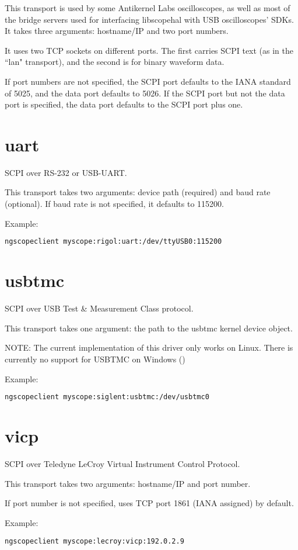 This transport is used by some Antikernel Labs oscilloscopes, as well as most of the bridge servers used for interfacing
libscopehal with USB oscilloscopes' SDKs. It takes three arguments: hostname/IP and two port numbers.

It uses two TCP sockets on different ports. The first carries SCPI text (as in the ``lan" transport), and the second is
for binary waveform data.

If port numbers are not specified, the SCPI port defaults to the IANA standard of 5025, and the data port defaults to
5026. If the SCPI port but not the data port is specified, the data port defaults to the SCPI port plus one.

\section{uart}

SCPI over RS-232 or USB-UART.

This transport takes two arguments: device path (required) and baud rate (optional). If baud rate is not specified, it
defaults to 115200.

Example:
\begin{lstlisting}[language=sh, numbers=none]
ngscopeclient myscope:rigol:uart:/dev/ttyUSB0:115200
\end{lstlisting}

\section{usbtmc}

SCPI over USB Test \& Measurement Class protocol.

This transport takes one argument: the path to the usbtmc kernel device object.

NOTE: The current implementation of this driver only works on Linux. There is currently no support for USBTMC on
Windows ()

Example:
\begin{lstlisting}[language=sh, numbers=none]
ngscopeclient myscope:siglent:usbtmc:/dev/usbtmc0
\end{lstlisting}

\section{vicp}

SCPI over Teledyne LeCroy Virtual Instrument Control Protocol.

This transport takes two arguments: hostname/IP and port number.

If port number is not specified, uses TCP port 1861 (IANA assigned) by default.

Example:
\begin{lstlisting}[language=sh, numbers=none]
ngscopeclient myscope:lecroy:vicp:192.0.2.9
\end{lstlisting}


